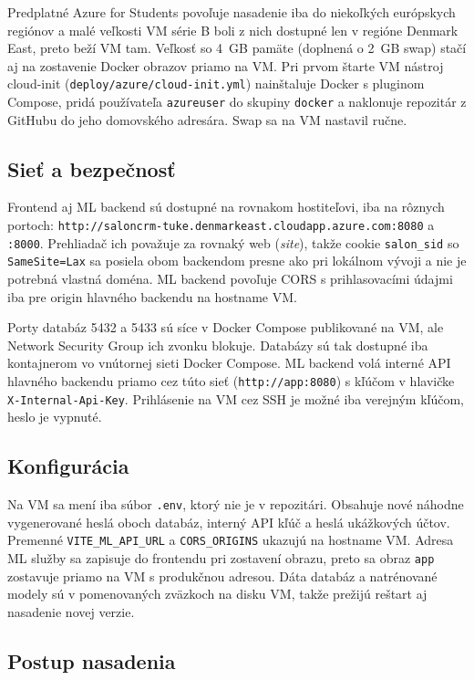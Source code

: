 Predplatné Azure for Students povoľuje nasadenie iba do niekoľkých európskych regiónov a malé veľkosti VM série B boli z nich dostupné len v regióne Denmark East, preto beží VM tam. Veľkosť so 4~GB pamäte (doplnená o 2~GB swap) stačí aj na zostavenie Docker obrazov priamo na VM. Pri prvom štarte VM nástroj cloud-init (\nolinkurl{deploy/azure/cloud-init.yml}) nainštaluje Docker s pluginom Compose, pridá používateľa \texttt{azureuser} do skupiny \texttt{docker} a naklonuje repozitár z GitHubu do jeho domovského adresára. Swap sa na VM nastavil ručne.

\subsection*{Sieť a bezpečnosť}

Frontend aj ML backend sú dostupné na rovnakom hostiteľovi, iba na rôznych portoch: \nolinkurl{http://saloncrm-tuke.denmarkeast.cloudapp.azure.com:8080} a \nolinkurl{:8000}. Prehliadač ich považuje za rovnaký web (\emph{site}), takže cookie \texttt{salon\_sid} so \texttt{SameSite=Lax} sa posiela obom backendom presne ako pri lokálnom vývoji a nie je potrebná vlastná doména. ML backend povoľuje CORS s prihlasovacími údajmi iba pre origin hlavného backendu na hostname VM.

Porty databáz 5432 a 5433 sú síce v Docker Compose publikované na VM, ale Network Security Group ich zvonku blokuje. Databázy sú tak dostupné iba kontajnerom vo vnútornej sieti Docker Compose. ML backend volá interné API hlavného backendu priamo cez túto sieť (\nolinkurl{http://app:8080}) s kľúčom v hlavičke \texttt{X-Internal-Api-Key}. Prihlásenie na VM cez SSH je možné iba verejným kľúčom, heslo je vypnuté.

\subsection*{Konfigurácia}

Na VM sa mení iba súbor \texttt{.env}, ktorý nie je v repozitári. Obsahuje nové náhodne vygenerované heslá oboch databáz, interný API kľúč a heslá ukážkových účtov. Premenné \texttt{VITE\_ML\_API\_URL} a \texttt{CORS\_ORIGINS} ukazujú na hostname VM. Adresa ML služby sa zapisuje do frontendu pri zostavení obrazu, preto sa obraz \texttt{app} zostavuje priamo na VM s produkčnou adresou. Dáta databáz a natrénované modely sú v pomenovaných zväzkoch na disku VM, takže prežijú reštart aj nasadenie novej verzie.

\subsection*{Postup nasadenia}

